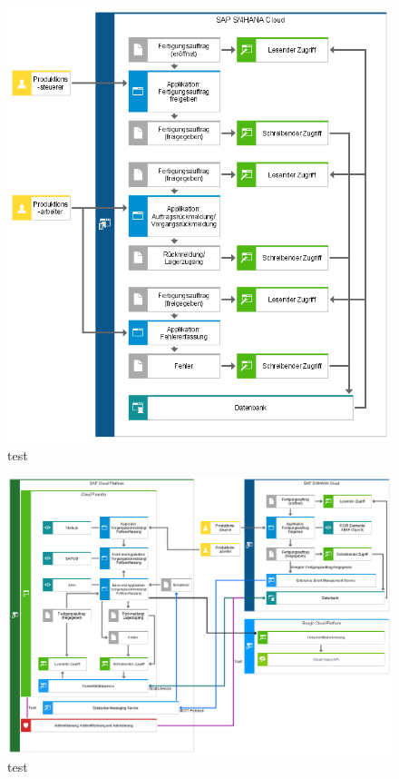 \begin{figure}[H]
	\centering 
	\includegraphics[width=\textwidth]{img/Arch_IST.png}	\caption[TEST]{\label{fig:logo}test
	}
\end{figure}

\begin{figure}[H]
	\centering 
	\includegraphics[angle=270,width=\textwidth]{img/Arch_SOLL.png}	\caption[TEST]{\label{fig:logo}test
	}
\end{figure}

